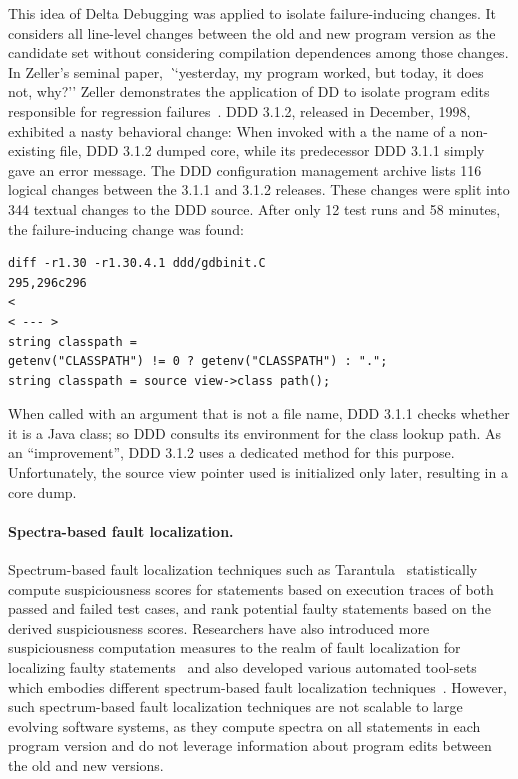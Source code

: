 This idea of Delta Debugging was applied to isolate failure-inducing changes. It considers all line-level changes between the old and new program version as the candidate set without considering compilation dependences among those changes. In Zeller's seminal paper, {\textit``yesterday, my program worked, but today, it does not, why?''} Zeller demonstrates the application of DD to isolate program edits responsible for regression failures~\cite{Zeller1999}. DDD 3.1.2, released in December, 1998, exhibited a nasty behavioral change: When invoked with a the name of a non-existing file, DDD 3.1.2 dumped core, while its predecessor DDD 3.1.1 simply gave an error message. The DDD configuration management archive lists 116 logical changes between the 3.1.1 and 3.1.2 releases. These changes were split into 344 textual changes to the DDD source. After only 12 test runs and 58 minutes, the failure-inducing change was found: 
\begin{verbatim}
diff -r1.30 -r1.30.4.1 ddd/gdbinit.C 
295,296c296
<
< --- >
string classpath =
getenv("CLASSPATH") != 0 ? getenv("CLASSPATH") : ".";
string classpath = source view->class path();
\end{verbatim} 

When called with an argument that is not a file name, DDD 3.1.1 checks whether it is a Java class; so DDD consults its environment for the class lookup path. As an ``improvement'', DDD 3.1.2 uses a dedicated method for this purpose. Unfortunately, the source view pointer used is initialized only later, resulting in a core dump. 


\paragraph{Spectra-based fault localization.} Spectrum-based fault localization techniques such as Tarantula~\cite{Jones2002:tarantula} statistically compute suspiciousness scores for statements based on execution traces of both passed and failed test cases, and rank potential faulty statements based on the derived suspiciousness scores. Researchers have also introduced more suspiciousness computation measures to the realm of fault localization for localizing faulty statements~\cite{naish2011model, lo2010comprehensive} and also developed various automated tool-sets which embodies different spectrum-based fault localization techniques~\cite{tarantula-url, janssen2009zoltar}. However, such spectrum-based fault localization techniques are not scalable to large evolving software systems, as they compute spectra on all statements in each program version and do not leverage information about program edits between the old and new versions.

